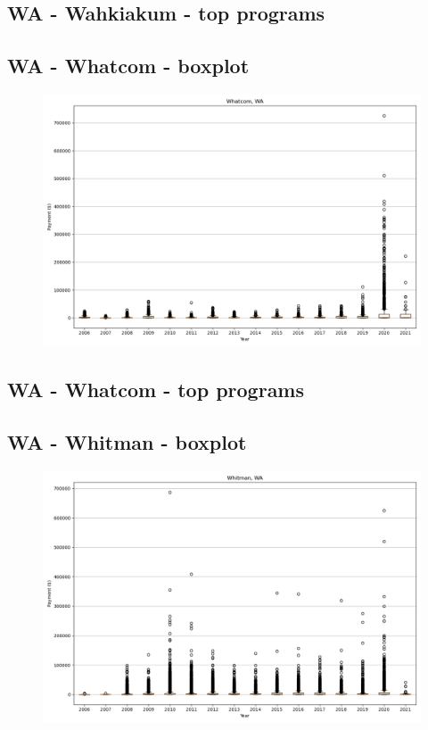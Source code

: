 \subsection*{WA - Wahkiakum - top programs}

\newpage
\subsection*{WA - Whatcom - boxplot}
\begin{figure}[h]
\centering
\includegraphics[width=7in]{../output/boxplots/counties/Whatcom-WA_boxplot.png}
\end{figure}


\subsection*{WA - Whatcom - top programs}

\newpage
\subsection*{WA - Whitman - boxplot}
\begin{figure}[h]
\centering
\includegraphics[width=7in]{../output/boxplots/counties/Whitman-WA_boxplot.png}
\end{figure}


